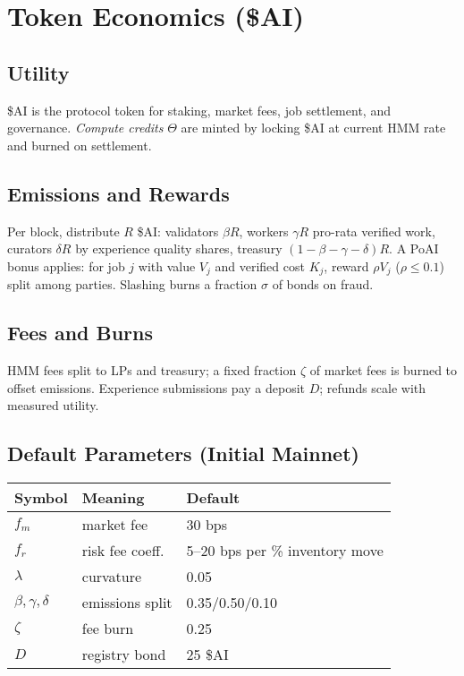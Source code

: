 \section{Token Economics (\$AI)}
\subsection{Utility}
\$AI is the protocol token for staking, market fees, job settlement, and governance. \emph{Compute credits} \(\Theta\) are minted by locking \$AI at current HMM rate and burned on settlement.

\subsection{Emissions and Rewards}
Per block, distribute \(R\) \$AI: validators \(\beta R\), workers \(\gamma R\) pro-rata verified work, curators \(\delta R\) by experience quality shares, treasury \((1-\beta-\gamma-\delta)R\). A PoAI bonus applies: for job \(j\) with value \(V_j\) and verified cost \(K_j\), reward \(\rho V_j\) (\(\rho\le 0.1\)) split among parties. Slashing burns a fraction \(\sigma\) of bonds on fraud.

\subsection{Fees and Burns}
HMM fees split to LPs and treasury; a fixed fraction \(\zeta\) of market fees is burned to offset emissions. Experience submissions pay a deposit \(D\); refunds scale with measured utility.

\subsection{Default Parameters (Initial Mainnet)}
\begin{table}[h]
\centering
\begin{tabular}{lll}
\toprule
Symbol & Meaning & Default \\
\midrule
\(f_m\) & market fee & 30 bps \\
\(f_r\) & risk fee coeff. & 5--20 bps per \% inventory move \\
\(\lambda\) & curvature & 0.05 \\
\(\beta,\gamma,\delta\) & emissions split & 0.35/0.50/0.10 \\
\(\zeta\) & fee burn & 0.25 \\
\(D\) & registry bond & 25 \$AI \\
\bottomrule
\end{tabular}
\end{table}
